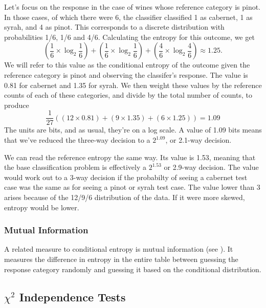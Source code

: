 Let's focus on the response in the case of wines whose reference
category is pinot.  In those cases, of which there were 6, the
classifier classified 1 as cabernet, 1 as syrah, and 4 as pinot.  
This corresponds to a discrete distribution with probabilities
1/6, 1/6 and 4/6.  Calculating the entropy for this outcome, we
get
%
\begin{equation}
\left( \frac{1}{6} \times \log_2 \frac{1}{6} \right)
+ \left( \frac{1}{6} \times \log_2 \frac{1}{6} \right)
+ \left( \frac{4}{6} \times \log_2 \frac{4}{6} \right)
\approx 1.25.
\end{equation}
%
We will refer to this value as the conditional entropy of the outcome
given the reference category is pinot and observing the classifer's
response.  The value is 0.81 for cabernet and 1.35 for syrah.
We then weight these values by the reference counts of each of these
categories, and divide by the total number of counts, to produce
%
\begin{equation}
\frac{1}{27} \left( (12 \times 0.81) + (9 \times 1.35) + (6 \times 1.25) \right) = 1.09
\end{equation}
%
The units are bits, and as usual, they're on a log scale.  A value of
1.09 bits means that we've reduced the three-way decision to a
$2^{1.09}$, or 2.1-way decision.  

We can read the reference entropy the same way.  Its value is 1.53,
meaning that the base classification problem is effectively a
$2^{1.53}$ or 2.9-way decision.  The value would work out to a 3-way
decision if the probabilty of seeing a cabernet test case was the same
as for seeing a pinot or syrah test case.  The value lower than
3 arises because of the 12/9/6 distribution of the data.  If it were
more skewed, entropy would be lower.

\subsubsection{Mutual Information}\label{section:classifier-eval-mutual-info}

A related measure to conditional entropy is mutual information (see
).  It measures the difference in
entropy in the entire table between guessing the response category
randomly and guessing it based on the conditional distribution.  


\subsection{$\chi^2$ Independence Tests}

